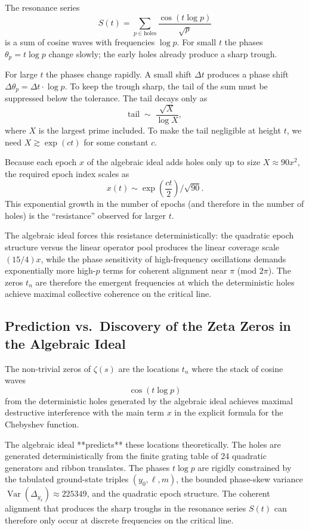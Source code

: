 \documentclass[11pt,a4paper]{article}
\begin{document}
The resonance series
\[
S(t)=\sum_{p\in\text{holes}}\frac{\cos(t\log p)}{\sqrt{p}}
\]
is a sum of cosine waves with frequencies \(\log p\). For small \(t\) the phases \(\theta_p=t\log p\) change slowly; the early holes already produce a sharp trough.

For large \(t\) the phases change rapidly. A small shift \(\Delta t\) produces a phase shift \(\Delta\theta_p=\Delta t\cdot\log p\). To keep the trough sharp, the tail of the sum must be suppressed below the tolerance. The tail decays only as
\[
\text{tail} \;\sim\; \frac{\sqrt{X}}{\log X},
\]
where \(X\) is the largest prime included. To make the tail negligible at height \(t\), we need \(X\gtrsim\exp(c t)\) for some constant \(c\).

Because each epoch \(x\) of the algebraic ideal adds holes only up to size \(X\approx90x^2\), the required epoch index scales as
\[
x(t)\sim\exp\left(\frac{c t}{2}\right)/\sqrt{90}.
\]
This exponential growth in the number of epochs (and therefore in the number of holes) is the “resistance” observed for larger \(t\).

The algebraic ideal forces this resistance deterministically: the quadratic epoch structure versus the linear operator pool produces the linear coverage scale \((15/4)x\), while the phase sensitivity of high-frequency oscillations demands exponentially more high-\(p\) terms for coherent alignment near \(\pi\) (mod \(2\pi\)). The zeros \(t_n\) are therefore the emergent frequencies at which the deterministic holes achieve maximal collective coherence on the critical line.

\subsection{Prediction vs.\ Discovery of the Zeta Zeros in the Algebraic Ideal}

The non-trivial zeros of \(\zeta(s)\) are the locations \(t_n\) where the stack of cosine waves
\[
\cos(t \log p)
\]
from the deterministic holes generated by the algebraic ideal achieves maximal destructive interference with the main term \(x\) in the explicit formula for the Chebyshev function.

The algebraic ideal **predicts** these locations theoretically. The holes are generated deterministically from the finite grating table of 24 quadratic generators and ribbon translates. The phases \(t \log p\) are rigidly constrained by the tabulated ground-state triples \((y_0,\ell,m)\), the bounded phase-skew variance \(\operatorname{Var}(\Delta_{y_x})\approx225349\), and the quadratic epoch structure. The coherent alignment that produces the sharp troughs in the resonance series \(S(t)\) can therefore only occur at discrete frequencies on the critical line.
\end{document}
